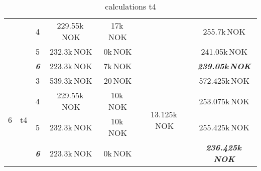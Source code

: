 \documentclass{article}
\begin{document}
\begin{table}[hbt!]
\begin{center}
\begin{tabular}[h]{|c|c|c||c|c|c||c|}
&	&	4		&		229.55k\,NOK		&	17k\,NOK		&										&	255.7k\,NOK\\
&	&	5		&		232.3k\,NOK			&	0k\,NOK			&										&	241.05k\,NOK\\
&	&	\textit{\textbf{6}}		&		223.3k\,NOK			&	7k\,NOK			&					&	\textit{\textbf{239.05k\,NOK}}\\
\hline
\multirow{4}{*}{6} & \multirow{4}{*}{t4}	
	&	3		&		539.3k\,NOK			&	20\,NOK			&	\multirow{4}{*}{13.125k\,NOK}		&	572.425k\,NOK\\
&	&	4		&		229.55k\,NOK		&	10k\,NOK		&										&	253.075k\,NOK\\
&	&	5		&		232.3k\,NOK			&	10k\,NOK		&										&	255.425k\,NOK\\
&	&	\textit{\textbf{6}}		&		223.3k\,NOK			&	0k\,NOK			&					&	\textit{\textbf{236.425k\,NOK}}\\
\hline
\end{tabular}
\caption{calculations t4}\label{tab:calct4}
\end{center}
\end{table}
\end{document}
